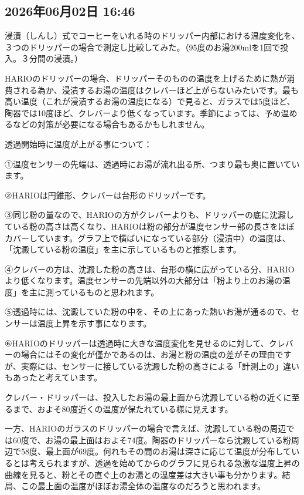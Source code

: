 \documentclass[facebook_diary.tex]{subfiles}
\begin{document}
\subsection*{2026年06月02日 16:46}

浸漬（しんし）式でコーヒーをいれる時のドリッパー内部における温度変化を、３つのドリッパーの場合で測定し比較してみた。（95度のお湯200mlを1回で投入。３分間の浸漬。）


HARIOのドリッパーの場合、ドリッパーそのものの温度を上げるために熱が消費される為か、浸漬するお湯の温度はクレバーほど上がらないみたいです。最も高い温度（これが浸漬するお湯の温度になる）で見ると、ガラスでは5度ほど、陶器では10度ほど、クレバーより低くなっています。季節によっては、予め温めるなどの対策が必要になる場合もあるかもしれません。


透過開始時に温度が上がる事について：

①温度センサーの先端は、透過時にお湯が流れ出る所、つまり最も奥に置いています。

②HARIOは円錐形、クレバーは台形のドリッパーです。

③同じ粉の量なので、HARIOの方がクレバーよりも、ドリッパーの底に沈澱している粉の高さは高くなり、HARIOは粉の部分が温度センサー部の長さをほぼカバーしています。グラフ上で横ばいになっている部分（浸漬中）の温度は、「沈澱している粉の温度」を主に示しているものと推察します。

④クレバーの方は、沈澱した粉の高さは、台形の横に広がっている分、HARIOより低くなります。温度センサーの先端以外の大部分は「粉より上のお湯の温度」を主に測っているものと思われます。

⑤透過時には、沈澱していた粉の中を、その上にあった熱いお湯が通るので、センサーは温度上昇を示す事になります。

⑥HARIOのドリッパーは透過時に大きな温度変化を見せるのに対して、クレバーの場合にはその変化が僅かであるのは、お湯と粉の温度の差がその理由ですが、実際には、センサーに接している沈澱した粉の高さによる「計測上の」違いもあったと考えています。


クレバー・ドリッパーは、投入したお湯の最上面から沈澱している粉の近くに至るまで、およそ80度近くの温度が保たれている様に見えます。

一方、HARIOのガラスのドリッパーの場合で言えば、沈澱している粉の周辺では60度で、お湯の最上面はおよそ74度。陶器のドリッパーなら沈澱している粉周辺で58度、最上面が69度。何れもその間のお湯は深さに応じて温度が分布しているとは考えられますが、透過を始めてからのグラフに見られる急激な温度上昇の曲線を見ると、粉とその直ぐ上のお湯との温度差は大きい事も分かります。結局、この最上面の温度がほぼお湯全体の温度なのだろうと思われます。
\end{document}

